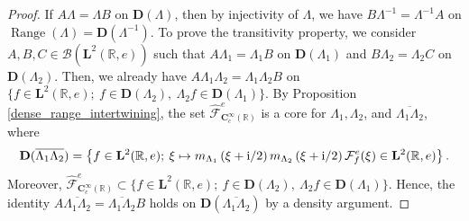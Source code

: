 \documentclass[12pt]{amsart}
\numberwithin{equation}{section}
\newcommand{\bb}{\mathbb}
\newcommand{\cc}{\mathcal}
\renewcommand{\ge}{\geqslant}
\renewcommand{\geq}{\geqslant}
\newcommand{\hpt}[2]{#2}
\newcommand{\ov}{\overline}
\newcommand{\bmrm}[2][2]{\mathbf{#2}^{#1}}
\newcommand{\Range}{\operatorname{Range}}
\newcommand{\fouho}{\cc{F}^{e}}
\newcommand{\C}{\mathbf{C}}
\newcommand{\D}{\mathbf{D}}
\theoremstyle{definition}
\theoremstyle{assump}
\theoremstyle{remark}
\begin{document}
\begin{proof}
If $\hpt{R16}{A\Lambda=\Lambda B}$ on $\D(\Lambda)$, then by injectivity of $\Lambda$, we have $B\Lambda^{-1}=\Lambda^{-1} A$ on $\Range(\Lambda)=\D(\Lambda^{-1})$. To prove the transitivity property, we consider  $A,B,C\in\mathscr{B}(\bmrm{L}(\bb{R},e))$ such that $A\Lambda_1=\Lambda_1 B$ on $\D(\Lambda_1)$ and $B\Lambda_2=\Lambda_2 C$ on $\D(\Lambda_2)$. Then, we already have $A\Lambda_1\Lambda_2=\Lambda_1\Lambda_2 B$ on $\{f\in\bmrm{L}(\bb{R},e); \: f\in\D(\Lambda_2), \ \Lambda_2 f\in\D(\Lambda_1)\}$.
By Proposition \ref{dense_range_intertwining}, the set $\widehat{\cc F}^e_{\!\C^\infty_c(\bb{R})}$ is a core for $\Lambda_1, \Lambda_2$, and $\ov{\Lambda_1\Lambda_2}$, where
\begin{align*}
	\D(\ov{\Lambda_1\Lambda_2})=\left\{f\in\bmrm{L}(\bb{R},e); \: \xi \mapsto m_{\Lambda_1}\left(\xi+{\rm{i}}/2\right)m_{\Lambda_2}\left(\xi+{\rm{i}}/2\right)\fouho _{f}(\xi)\in\bmrm{L}(\bb{R},e)\right\}.
\end{align*}
 Moreover, $\widehat{\cc F}^e_{\!\C^\infty_c(\bb{R})}\subset\{f\in\bmrm{L}(\bb{R},e); \: f\in\D(\Lambda_2), \ \Lambda_2 f\in\D(\Lambda_1)\}$. Hence, the identity $A\ov{\Lambda_1\Lambda_2}=\ov{\Lambda_1\Lambda_2} B$ holds on $\D(\ov{\Lambda_1\Lambda_2})$ by a density argument.

%

\end{proof}
\end{document}
